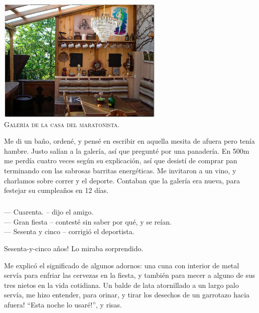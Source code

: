 \begin{center} \includegraphics[width=300px]{images/DSC01605.JPG}\\
\textsc{Galer\'ia de la casa del maratonista.} \end{center}

Me di un ba\~no, orden\'e, y pens\'e en escribir en aquella mesita de afuera
pero ten\'ia hambre. Justo sal\'ian a la galer\'ia, as\'i que pregunt\'e por
una panader\'ia. En 500m me perd\'ia cuatro veces seg\'un su explicaci\'on,
as\'i que desist\'i de comprar pan terminando con las sabrosas barritas
energ\'eticas. Me invitaron a un vino, y charlamos sobre correr y el deporte.
Contaban que la galer\'ia era nueva, para festejar su cumplea\~nos en 12
d\'ias.

\subparagraph{}\label{ssub:queEdadTenes} --- Cuarenta. -- dijo el amigo.\\ ---
Gran fiesta -- contest\'e sin saber por qu\'e, y se re\'ian.\\ --- Sesenta y
cinco -- corrigi\'o el deportista.\\ \hangindent=1cm

\textexclamdown Sesenta-y-cinco a\~nos! Lo miraba sorprendido.

Me explic\'o el significado de algunos adornos: una cuna con interior de metal
serv\'ia para enfriar las cervezas en la fiesta, y tambi\'en para mecer a
alguno de sus tres nietos en la vida cotidiana. Un balde de lata atornillado a
un largo palo serv\'ia, me hizo entender, para orinar, \textexclamdown y
tirar los desechos de un garrotazo hacia afuera! ``\textexclamdown Esta noche lo
usar\'e!'', y risas.

